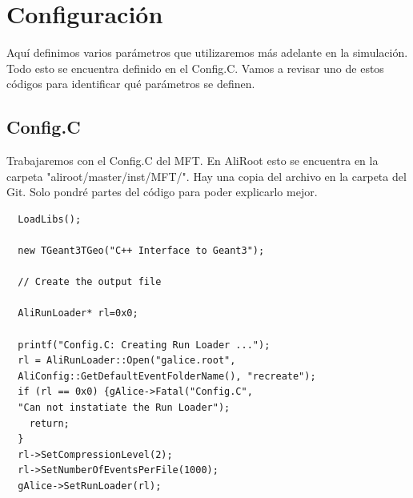 \documentclass{article}
\begin{document}
\newpage

\section{Configuraci\'on}

Aqu\'i definimos varios par\'ametros que utilizaremos m\'as adelante en la simulaci\'on. Todo esto se encuentra definido en el Config.C. Vamos a revisar uno de estos c\'odigos para identificar qu\'e par\'ametros se definen.

\subsection{Config.C}

Trabajaremos con el Config.C del MFT. En AliRoot esto se encuentra en la carpeta "aliroot/master/inst/MFT/". Hay una copia del archivo en la carpeta del Git.
Solo pondr\'e partes del c\'odigo para poder explicarlo mejor.

\begin{tcolorbox}[breakable]
\begin{verbatim}
  LoadLibs();

  new TGeant3TGeo("C++ Interface to Geant3");

  // Create the output file

  AliRunLoader* rl=0x0;

  printf("Config.C: Creating Run Loader ...");
  rl = AliRunLoader::Open("galice.root", 
  AliConfig::GetDefaultEventFolderName(), "recreate");
  if (rl == 0x0) {gAlice->Fatal("Config.C",
  "Can not instatiate the Run Loader");
    return;
  }
  rl->SetCompressionLevel(2);
  rl->SetNumberOfEventsPerFile(1000);
  gAlice->SetRunLoader(rl);
\end{verbatim}
\end{tcolorbox}
\end{document}
